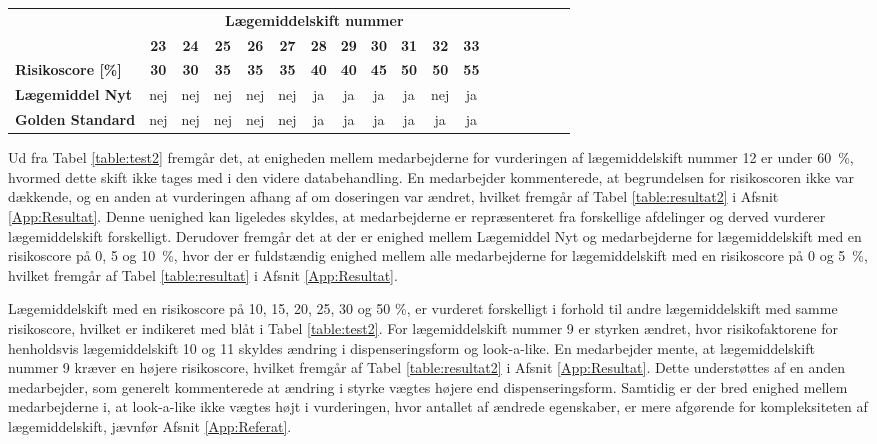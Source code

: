 \begin{longtable}{l|c|c|c|c|c|c|c|c|c|c|c|c|c|c|c|c|c}
\rowcolor[HTML]{C0C0C0} & \multicolumn{11}{|c}{\textbf{Lægemiddelskift nummer}} \\ 
\rowcolor[HTML]{C0C0C0} & \textbf{23} & \textbf{24} & \textbf{25} & \textbf{26} & \textbf{27} & \textbf{28} &  \textbf{29} & \textbf{30} & \textbf{31} & \textbf{32} & \textbf{33}  \\ \cline{1-10}
\cellcolor[HTML]{C0C0C0}\textbf{Risikoscore [\%]} & \textbf{30} & \textbf{30} & \textbf{35} & \textbf{35} & \textbf{35} & \textbf{40} & \textbf{40} & \textbf{45} & \textbf{50} & \cellcolor[HTML]{ECF4FF}\textbf{50} & \textbf{55} \\ \hline 
\cellcolor[HTML]{C0C0C0}\textbf{Lægemiddel Nyt} & nej & nej & nej & nej & nej & ja & ja & ja & ja & \cellcolor[HTML]{D4EED3} nej & ja\\ \hline
\cellcolor[HTML]{C0C0C0}\textbf{Golden Standard} & nej & nej & nej & nej & nej & ja & ja& ja & ja&\cellcolor[HTML]{D4EED3}ja & ja \\\hline
\end{longtable}
\vspace{0.5cm}

Ud fra Tabel \ref{table:test2} fremgår det, at enigheden mellem medarbejderne for vurderingen af lægemiddelskift nummer 12 er under 60~\%, hvormed dette skift ikke tages med i den videre databehandling. En medarbejder kommenterede, at begrundelsen for risikoscoren ikke var dækkende, og en anden at vurderingen  afhang af om doseringen var ændret, hvilket fremgår af Tabel \ref{table:resultat2} i Afsnit \ref{App:Resultat}. Denne uenighed kan ligeledes skyldes, at medarbejderne er repræsenteret fra forskellige afdelinger og derved vurderer lægemiddelskift forskelligt. Derudover fremgår det at der er enighed mellem Lægemiddel Nyt og medarbejderne for lægemiddelskift med en risikoscore på 0, 5 og 10~\%, hvor der er  fuldstændig enighed mellem alle medarbejderne for lægemiddelskift med en risikoscore på 0 og 5~\%, hvilket fremgår af Tabel \ref{table:resultat} i Afsnit \ref{App:Resultat}.

Lægemiddelskift med en risikoscore på 10, 15, 20, 25, 30 og 50 \%, er vurderet forskelligt i forhold til andre lægemiddelskift med samme risikoscore, hvilket er indikeret med blåt i Tabel \ref{table:test2}. For lægemiddelskift nummer 9 er styrken ændret, hvor risikofaktorene for henholdsvis lægemiddelskift 10 og 11 skyldes ændring i dispenseringsform og look-a-like. En medarbejder mente, at lægemiddelskift nummer 9 kræver en højere risikoscore, hvilket fremgår af Tabel \ref{table:resultat2} i Afsnit \ref{App:Resultat}. Dette understøttes af en anden medarbejder, som generelt kommenterede at ændring i styrke vægtes højere end dispenseringsform. Samtidig er der bred enighed mellem medarbejderne i, at look-a-like ikke vægtes højt i vurderingen, hvor antallet af ændrede egenskaber,  er mere afgørende for kompleksiteten af lægemiddelskift, jævnfør Afsnit \ref{App:Referat}. 

